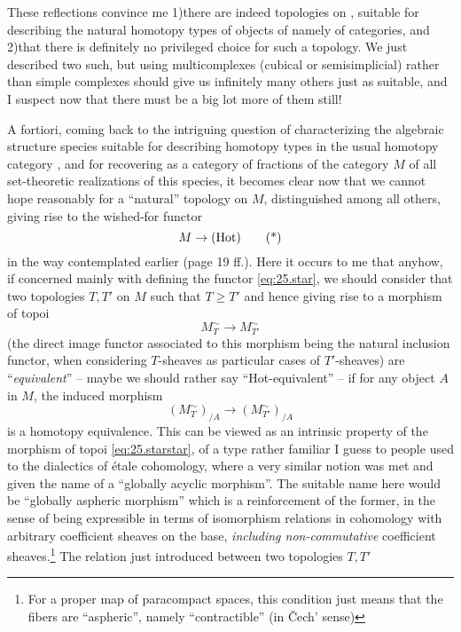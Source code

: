 These reflections convince me 1)\enspace there are indeed topologies
on \Cat{}, suitable for describing the natural homotopy types of
objects of \Cat{} namely of categories, and 2)\enspace that there is
definitely no privileged choice for such a topology. We
just described two such, but using multicomplexes (cubical or
semisimplicial) rather than simple complexes should give us infinitely
many others just as suitable, and I suspect now that there must be a
big lot more of them still!

\label{sec:25}%
A fortiori, coming back to the intriguing question of characterizing
the algebraic structure species suitable for describing homotopy types
in the usual homotopy category \Hot{}, and for recovering \Hot{} as a
category of fractions of the category $M$ of all set-theoretic
realizations of this species, it becomes clear now that we cannot hope
reasonably for a ``natural'' topology on $M$, distinguished among all
others, giving rise to the wished-for functor
\begin{equation}
  \label{eq:25.star}
  M \to {\ensuremath{(\mathrm{Hot})}} \tag{*}
\end{equation}
in the way contemplated earlier (page 19 ff.). Here it occurs to me
that anyhow, if concerned mainly with defining the functor
\eqref{eq:25.star}, we should consider that two topologies $T,T'$ on
$M$ such that $T \ge T'$ and hence giving rise to a morphism of topoi
\begin{equation}
  \label{eq:25.starstar}
  M_T^\sim \to M_{T'}^\sim \tag{**}
\end{equation}
(the direct image functor associated to this morphism being the
natural inclusion functor, when considering $T$-sheaves as particular
cases of $T'$-sheaves) are ``\emph{equivalent}'' -- maybe we should
rather say ``Hot-equivalent'' -- if for any object $A$ in $M$, the
induced morphism
\[ (M_T^\sim)_{/A} \to (M_{T'}^\sim)_{/A} \]
is a homotopy equivalence. This can be viewed as an intrinsic property
of the morphism of topoi \eqref{eq:25.starstar}, of a type rather
familiar I guess to people used to the dialectics of \'etale
cohomology, where a very similar notion was met and given the name of
a ``globally acyclic morphism''. The suitable name here would be
``globally aspheric morphism'' which is a reinforcement of the former,
in the sense of being expressible in terms of isomorphism relations in
cohomology with arbitrary coefficient sheaves on the base,
\emph{including non-commutative} coefficient sheaves.\footnote{For a
  proper map of paracompact spaces, this condition just means that the
  fibers are ``aspheric'', namely ``contractible'' (in \v Cech'
  sense)} The relation just introduced between two topologies $T,T'$
